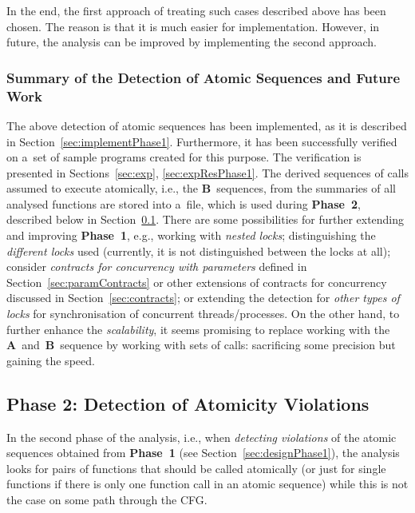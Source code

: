 In the end, the first approach of treating such cases described above has
been chosen. The reason is that it is much easier for implementation.
However, in future, the analysis can be improved by implementing the second
approach.

\subsubsection{%
    Summary of the Detection of Atomic Sequences and Future Work
}

The above detection of atomic sequences has been implemented, as it is
described in Section~\ref{sec:implementPhase1}. Furthermore, it has
been successfully verified on a~set of sample programs created for
this purpose. The verification is presented in Sections~\ref{sec:exp},
\ref{sec:expResPhase1}. The derived sequences of calls assumed to
execute atomically, i.e., the \textbf{B}~sequences, from the summaries
of all analysed functions are stored into a~file, which is used during
\textbf{Phase~2}, described below in Section~\ref{sec:designPhase2}.
There are some possibilities for further extending and improving
\textbf{Phase~1}, e.g., working with \emph{nested locks}; distinguishing
the \emph{different locks} used (currently, it is not distinguished
between the locks at all); consider \emph{contracts for concurrency with
parameters} defined in Section~\ref{sec:paramContracts} or other extensions
of contracts for concurrency discussed in Section~\ref{sec:contracts}; or
extending the detection for \emph{other types of locks} for synchronisation
of concurrent threads/processes. On the other hand, to further enhance the
\emph{scalability}, it seems promising to replace working with the
\textbf{A}~and~\textbf{B}~sequence by working with sets of calls: sacrificing
some precision but gaining the speed.


\subsection{Phase 2: Detection of Atomicity Violations}
\label{sec:designPhase2}

In the second phase of the analysis, i.e., when \emph{detecting
violations} of the atomic sequences obtained from \textbf{Phase~1}
(see Section~\ref{sec:designPhase1}), the analysis looks for pairs of
functions that should be called atomically (or just for single functions
if there is only one function call in an atomic sequence) while this is
not the case on some path through the CFG.

